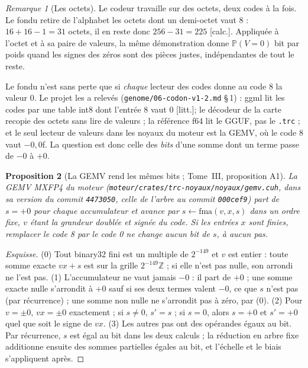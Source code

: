 \documentclass[11pt, a4paper]{article}
\newtheorem{proposition}{Proposition}
\theoremstyle{remark}
\newtheorem{remark}[proposition]{Remarque}
\newcommand{\etiq}[1]{\textsf{\scriptsize[#1]}}
\newcommand{\calc}{\etiq{calc.}}
\newcommand{\litt}{\etiq{litt.}}
\newcommand{\fichier}[1]{\textsf{\footnotesize\nolinkurl{#1}}}
\newcommand{\Prob}{\mathbb{P}}
\begin{document}
\begin{remark}[Les octets]\label{rem-octets}
Le codeur travaille sur des octets, deux codes à la fois. Le fondu retire de l'alphabet les octets dont un demi-octet vaut 8 : $16 + 16 - 1 = 31$ octets, il en reste donc $256 - 31 = 225$ \calc. Appliquée à l'octet et à sa paire de valeurs, la même démonstration donne $\Prob(V = 0)$ bit par poids quand les signes des zéros sont des pièces justes, indépendantes de tout le reste.
\end{remark}

Le fondu n'est sans perte que si \emph{chaque} lecteur des codes donne au code 8 la valeur 0. Le projet les a relevés (\fichier{genome/06-codon-v1-2.md} §\,1) : ggml lit les codes par une table int8 dont l'entrée 8 vaut 0 \litt ; le décodeur de la carte recopie des octets sans lire de valeurs ; la référence f64 lit le GGUF, pas le \texttt{.trc} ; et le seul lecteur de valeurs dans les noyaux du moteur est la GEMV, où le code 8 vaut $-0{,}0$f. La question est donc celle des \emph{bits} d'une somme dont un terme passe de $-0$ à $+0$.

\begin{proposition}[La GEMV rend les mêmes bits ; Tome~III, proposition A1]\label{prop-a1}
La GEMV MXFP4 du moteur (\fichier{moteur/crates/trc-noyaux/noyaux/gemv.cuh}, dans sa version du commit \texttt{4473050}, celle de l'arbre au commit \texttt{000cef9}) part de $s = +0$ pour chaque accumulateur et avance par $s \leftarrow \mathrm{fma}(v, x, s)$ dans un ordre fixe, $v$ étant la grandeur doublée et signée du code. Si les entrées $x$ sont finies, remplacer le code 8 par le code 0 ne change aucun bit de $s$, à aucun pas.
\end{proposition}
\begin{proof}[Esquisse]
(0) Tout binary32 fini est un multiple de $2^{-149}$ et $v$ est entier : toute somme exacte $v x + s$ est sur la grille $2^{-149}\mathbb{Z}$ ; si elle n'est pas nulle, son arrondi ne l'est pas. (1) L'accumulateur ne vaut jamais $-0$ : il part de $+0$ ; une somme exacte nulle s'arrondit à $+0$ sauf si ses deux termes valent $-0$, ce que $s$ n'est pas (par récurrence) ; une somme non nulle ne s'arrondit pas à zéro, par (0). (2) Pour $v = \pm 0$, $v x = \pm 0$ exactement ; si $s \neq 0$, $s' = s$ ; si $s = 0$, alors $s = +0$ et $s' = +0$ quel que soit le signe de $v x$. (3) Les autres pas ont des opérandes égaux au bit. Par récurrence, $s$ est égal au bit dans les deux calculs ; la réduction en arbre fixe additionne ensuite des sommes partielles égales au bit, et l'échelle et le biais s'appliquent après.
\end{proof}
\end{document}
